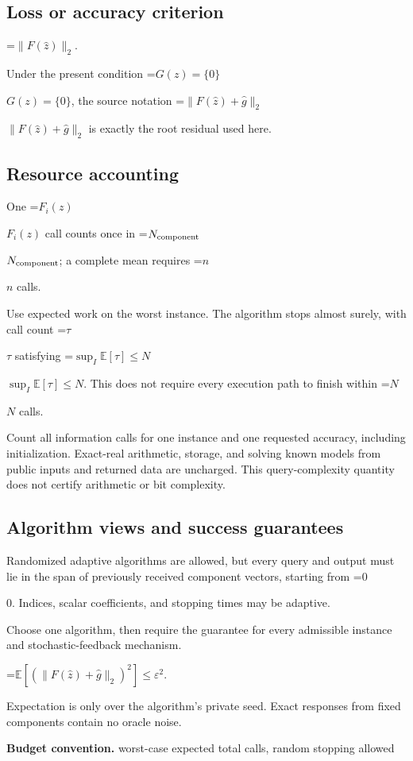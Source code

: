 \documentclass[10pt,a4paper]{article}
\newcommand{\AtlasMath}[1]{\par\begingroup\centering\setbox0=\hbox{$\displaystyle #1$}\ifdim\wd0>1.4\linewidth\typeout{ATLAS WIDE FORMULA: \the\wd0}\fi\ifdim\wd0>\linewidth\resizebox{\linewidth}{!}{\box0}\else\box0\fi\par\endgroup}
\newcommand{\AtlasInlineMath}[1]{\begingroup\setbox0=\hbox{$#1$}\ifdim\wd0>.4\linewidth\endgroup\AtlasMath{#1}\else\endgroup$#1$\fi}
\begin{document}
\subsection{Loss or accuracy criterion}

\AtlasMath{\|F(\widehat z)\|_2.}


Under the present condition \AtlasInlineMath{G(z)=\{0\}}, the source notation \AtlasInlineMath{\|F(\widehat z)+\widehat g\|_2} is exactly the root residual used here.

\subsection{Resource accounting}
One \AtlasInlineMath{F_i(z)} call counts once in \AtlasInlineMath{N_{\rm component}}; a complete mean requires \AtlasInlineMath{n} calls.

Use expected work on the worst instance. The algorithm stops almost surely, with call count \AtlasInlineMath{\tau} satisfying \AtlasInlineMath{\sup_I\mathbb{E}[\tau]\le N}. This does not require every execution path to finish within \AtlasInlineMath{N} calls.

Count all information calls for one instance and one requested accuracy, including initialization. Exact-real arithmetic, storage, and solving known models from public inputs and returned data are uncharged. This query-complexity quantity does not certify arithmetic or bit complexity.

\subsection{Algorithm views and success guarantees}
Randomized adaptive algorithms are allowed, but every query and output must lie in the span of previously received component vectors, starting from \AtlasInlineMath{0}. Indices, scalar coefficients, and stopping times may be adaptive.

Choose one algorithm, then require the guarantee for every admissible instance and stochastic-feedback mechanism.


\AtlasMath{\mathbb{E}\!\left[\left(\|F(\widehat{z})+\widehat{g}\|_2\right)^2\right]\le\varepsilon^2.}


Expectation is only over the algorithm's private seed. Exact responses from fixed components contain no oracle noise.

\textbf{Budget convention.} worst-case expected total calls, random stopping allowed
\end{document}
